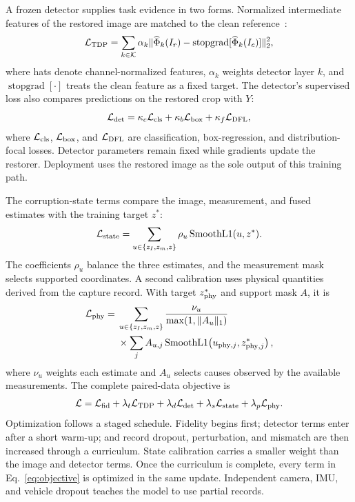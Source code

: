 \documentclass[journal]{IEEEtran}
\newcommand{\stopgrad}{\operatorname{stopgrad}}
\begin{document}
A frozen detector supplies task evidence in two forms. Normalized intermediate features of the restored image are matched to the clean reference~\cite{kim2024tdp}:
\begin{equation}
\mathcal{L}_{\rm TDP}=\sum_{k\in\mathcal{K}}\alpha_k
\|\widehat{\Phi}_k(I_r)-\stopgrad[\widehat{\Phi}_k(I_c)]\|_2^2,
\label{eq:tdp}
\end{equation}
where hats denote channel-normalized features, $\alpha_k$ weights detector layer $k$, and $\stopgrad[\cdot]$ treats the clean feature as a fixed target. The detector's supervised loss also compares predictions on the restored crop with $Y$:
\begin{equation}
\mathcal{L}_{\rm det}=\kappa_c\mathcal{L}_{\rm cls}
+\kappa_b\mathcal{L}_{\rm box}+\kappa_f\mathcal{L}_{\rm DFL},
\label{eq:detectorloss}
\end{equation}
where $\mathcal{L}_{\rm cls}$, $\mathcal{L}_{\rm box}$, and $\mathcal{L}_{\rm DFL}$ are classification, box-regression, and distribution-focal losses. Detector parameters remain fixed while gradients update the restorer. Deployment uses the restored image as the sole output of this training path.

The corruption-state terms compare the image, measurement, and fused estimates with the training target $z^*$:
\begin{equation}
\mathcal{L}_{\rm state}=\sum_{u\in\{z_I,z_m,z\}}\rho_u
\operatorname{SmoothL1}(u,z^*).
\label{eq:stateloss}
\end{equation}
The coefficients $\rho_u$ balance the three estimates, and the measurement mask selects supported coordinates. A second calibration uses physical quantities derived from the capture record. With target $z^*_{\rm phy}$ and support mask $A$, it is
\begin{equation}
\begin{split}
\mathcal{L}_{\rm phy}={}&
\sum_{u\in\{z_I,z_m,z\}}\frac{\nu_u}{\max(1,\|A_u\|_1)}\\
&\times\sum_j A_{u,j}\operatorname{SmoothL1}
\!\left(u_{{\rm phy},j},z^*_{{\rm phy},j}\right),
\end{split}
\label{eq:physicalloss}
\end{equation}
where $\nu_u$ weights each estimate and $A_u$ selects causes observed by the available measurements. The complete paired-data objective is
\begin{equation}
\mathcal{L}=\mathcal{L}_{\rm fid}
+\lambda_t\mathcal{L}_{\rm TDP}
+\lambda_d\mathcal{L}_{\rm det}
+\lambda_s\mathcal{L}_{\rm state}
+\lambda_p\mathcal{L}_{\rm phy}.
\label{eq:objective}
\end{equation}
Optimization follows a staged schedule. Fidelity begins first; detector terms enter after a short warm-up; and record dropout, perturbation, and mismatch are then increased through a curriculum. State calibration carries a smaller weight than the image and detector terms. Once the curriculum is complete, every term in Eq.~\eqref{eq:objective} is optimized in the same update. Independent camera, IMU, and vehicle dropout teaches the model to use partial records.
\end{document}
